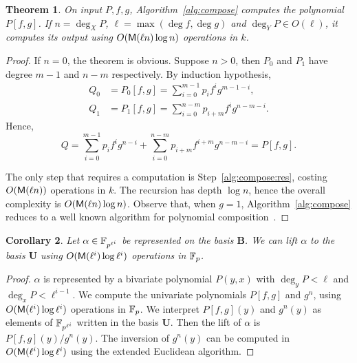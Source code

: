 \documentclass{sig-alternate}
\newcommand{\bb}{\mathbf{B}}
\newcommand{\uu}{\mathbf{U}}  %
\newtheorem{theorem}{Theorem}
\newtheorem{corollary}[theorem]{Corollary}
\begin{document}
\begin{theorem}
  \label{th:compose}
  On input $P,f,g$, Algorithm~\ref{alg:compose} computes the
  polynomial $P[f,g]$. If $n=\deg_XP$, $\ell=\max(\deg f, \deg g)$ and
  $\deg_YP\in O(\ell)$, it computes its output using $O(\mathsf{M}(\ell
  n)\log n)$ operations in $k$.
\end{theorem}
\begin{proof}
  If $n=0$, the theorem is obvious. Suppose $n>0$, then $P_0$ and
  $P_1$ have degree $m-1$ and $n-m$ respectively. By induction
  hypothesis,
  \begin{equation}
    \begin{aligned}
      Q_0 &= P_0[f,g] = \sum_{i=0}^{m-1}p_if^ig^{m-1-i},\\
      Q_1 &= P_1[f,g] = \sum_{i=0}^{n-m}p_{i+m}f^ig^{n-m-i}.   
    \end{aligned}
  \end{equation}
  Hence,
  \begin{equation}
    Q = \sum_{i=0}^{m-1}p_if^ig^{n-i} +
    \sum_{i=0}^{n-m}p_{i+m}f^{i+m}g^{n-m-i} =
    P[f,g].
  \end{equation}

  The only step that requires a computation is
  Step~\ref{alg:compose:res}, costing $O(\mathsf{M}(\ell n))$ operations in
  $k$. The recursion has depth $\log n$, hence the overall complexity
  is $O(\mathsf{M}(\ell n)\log n)$.  Observe that, when $g=1$,
  Algorithm~\ref{alg:compose} reduces to a well known algorithm for
  polynomial composition~\cite[Ex.~9.20]{vzGG}.
\end{proof}

\begin{corollary}
  Let $\alpha\in\mathbb{F}_{p^{\ell^i}}$ be represented on the basis $\bb$.
  We can \emph{lift} $\alpha$ to the basis $\uu$ using
  $O(\mathsf{M}(\ell^i)\log\ell^i)$ operations in $\mathbb{F}_p$.
\end{corollary}
\begin{proof}
  $\alpha$ is represented by a bivariate polynomial $P(y,x)$ with
  $\deg_yP<\ell$ and $\deg_xP<\ell^{i-1}$.  We compute the univariate
  polynomials $P[f,g]$ and $g^n$, using $O(\mathsf{M}(\ell^i)\log\ell^i)$
  operations in $\mathbb{F}_p$. We interpret $P[f,g](y)$ and $g^n(y)$ as
  elements of $\mathbb{F}_{p^{\ell^i}}$ written in the basis $\uu$. Then the
  lift of $\alpha$ is $P[f,g](y)/g^n(y)$. The inversion of $g^n(y)$
  can be computed in $O(\mathsf{M}(\ell^i)\log\ell^i)$ using the extended
  Euclidean algorithm.
\end{proof}
\end{document}
